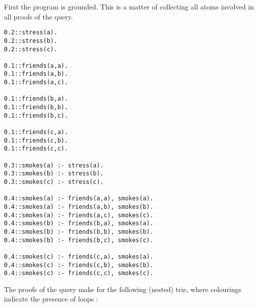 


First the program is grounded. This is a matter of collecting all atoms involved in all proofs of the query.

\begin{code}
\begin{verbatim}
0.2::stress(a).
0.2::stress(b).
0.2::stress(c).

0.1::friends(a,a).
0.1::friends(a,b).
0.1::friends(a,c).

0.1::friends(b,a).
0.1::friends(b,b).
0.1::friends(b,c).

0.1::friends(c,a).
0.1::friends(c,b).
0.1::friends(c,c).

0.3::smokes(a) :- stress(a).
0.3::smokes(b) :- stress(b).
0.3::smokes(c) :- stress(c).

0.4::smokes(a) :- friends(a,a), smokes(a).
0.4::smokes(a) :- friends(a,b), smokes(b).
0.4::smokes(a) :- friends(a,c), smokes(c).
0.4::smokes(b) :- friends(b,a), smokes(a).
0.4::smokes(b) :- friends(b,b), smokes(b).
0.4::smokes(b) :- friends(b,c), smokes(c).

0.4::smokes(c) :- friends(c,a), smokes(a).
0.4::smokes(c) :- friends(c,b), smokes(b).
0.4::smokes(c) :- friends(c,c), smokes(c).
\end{verbatim}
\label{code:base}
\vspace{0.5cm}
\end{code}

\noindent The proofs of the query make for the following (nested) trie, where colourings indicate the presence of loops :

